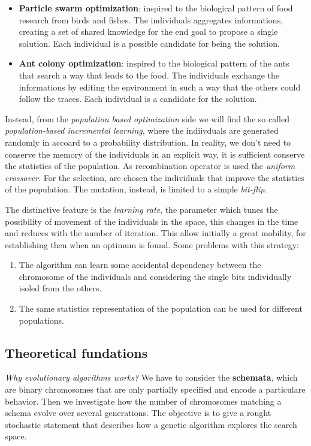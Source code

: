 \documentclass{article}
\begin{document}
\begin{itemize}
    \item \textbf{Particle swarm optimization}: inspired to the biological pattern
    of food research from birds and fishes. The individuals aggregates informations,
    creating a set of shared knowledge for the end goal to propose a single solution.
    Each individual is a possible candidate for being the solution.
    \item \textbf{Ant colony optimization}: inspired to the biological pattern of the ants
    that search a way that leads to the food. The individuals exchange the informations
    by editing the environment in such a way that the others could follow the traces.
    Each individual is a candidate for the solution.
\end{itemize}
Instead, from the \textit{population based optimization} side we will find the so called
\textit{population-based incremental learning}, where the indiivduals are generated randomly
in accoard to a probability distribution. In reality, we don't need to conserve the memory of
the individuals in an explicit way, it is sufficient conserve the statistics of the population.
As recombination operator is used the \textit{uniform crossover}. For the selection,
are chosen the individuals that improve the statistics of the population. The mutation, instead,
is limited to a simple \textit{bit-flip}.

The distinctive feature is the \textit{learning rate}, the parameter which tunes the possibility
of movement of the individuals in the space, this changes in the time and reduces with the number
of iteration. This allow initially a great mobility, for establishing then when an optimum is
found. Some problems with this strategy:
\begin{enumerate}
    \item The algorithm can learn some accidental dependency between the chromosome of the
    individuals and considering the single bits individually isoled from the others.
    \item The same statistics representation of the population can be used for different populations.
\end{enumerate}

\subsection{Theoretical fundations}
\textit{Why evolutionary algorithms works?} We have to consider the \textbf{schemata}, which
are binary chromosomes that are only partially specified and encode a particulare behavior.
Then we investigate how the number of chromosomes matching a schema evolve over several generations.
The objective is to give a rought stochastic statement that describes how a genetic algorithm
explores the search space.
\end{document}
